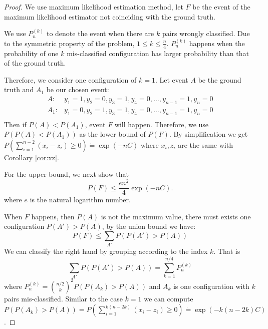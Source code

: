 \documentclass{article}
\begin{document}
\begin{proof}
	We use maximum likelihood estimation method, let $F$ be the event of the maximum likelihood estimator not coinciding with the ground truth. 
    
    We use $P_n^{(k)}$ to denote the event when there are $k$ pairs wrongly classified. Due to the symmetric property of the problem, $1\leq k \leq \frac{n}{4}$.
    $P_n^{(k)}$ happens when the probability of one $k$ mis-classified configuration has larger probability than that of the ground truth. 
	
	Therefore, we consider one configuration of $k=1$. Let event $A$ be the ground truth and $A_1$ be our chosen event:
	\begin{align*}
	A: & y_1 = 1, y_2 = 0, y_3 = 1, y_4 = 0, \dots, y_{n-1} = 1, y_n = 0 \\
	A_1: & y_1 = 0, y_2 = 1, y_3 = 1, y_4 = 0, \dots, y_{n-1} = 1, y_n = 0 \\	
	\end{align*}
	Then if $P(A) < P(A_1)$, event $F$ will happen. Therefore, we use $P(P(A) < P(A_1))$ as the lower bound of $P(F)$.
	By simplification we get $P(\sum_{i=1}^{n-2} (x_i - z_i) \geq 0) \dot{=} \exp (-nC)$ where $x_i, z_i$ are the same with Corollary \ref{cor:xz}.
	
	For the upper bound, we next show that 
	\begin{equation}
	P(F) \leq \frac{en^2}{4} \exp(-nC).
	\end{equation}
	where $e$ is the natural logarithm number.
	
	When $F$ happens, then $P(A)$ is not the maximum value, there must exists one configuration $P(A') > P(A)$, by the union bound we have:
	\begin{equation}\label{eq:outsidelemmaboundpf5_IT_ub}
	P(F) \leq \sum_{A'} P(P(A') > P(A))
	\end{equation}
	We can classify the right hand by grouping according to the index $k$. That is
	\begin{equation}\label{eq:with14epsilon_14}
	\sum_{A'} P(P(A') > P(A)) = \sum_{k=1}^{n/4} P_{n}^{(k)}
	\end{equation}
	where $P_{n}^{(k)} = \binom{n/2}{k}^2 P(P(A_k) > P(A))$ and $A_k$ is one configuration with $k$ pairs mis-classified.
	Similar to the case $k=1$ we can compute $P(P(A_k) > P(A)) = P(\sum_{i=1}^{k(n-2k)} (x_i - z_i) \geq 0)\dot{=} \exp(-k(n-2k)C)$.
	

\end{proof}
\end{document}
